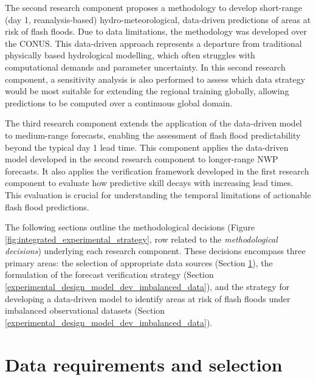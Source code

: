 The  second research component proposes a methodology to develop short-range (day 1, reanalysis-based) hydro-meteorological, data-driven predictions of areas at risk of flash floods. Due to data limitations, the methodology was developed over the CONUS. This data-driven approach represents a departure from traditional physically based hydrological modelling, which often struggles with computational demands and parameter uncertainty. In this second research component, a sensitivity analysis is also performed to assess which data strategy would be most suitable for extending the regional training globally, allowing predictions to be computed over a continuous global domain.

The  third research component extends the application of the data-driven model to medium-range forecasts, enabling the assessment of flash flood predictability beyond the typical day 1 lead time. This component applies the data-driven model developed in the second research component to longer-range NWP forecasts. It also applies the verification framework developed in the first research component to evaluate how predictive skill decays with increasing lead times. This evaluation is crucial for understanding the temporal limitations of actionable flash flood predictions.

The following sections outline the methodological decisions (Figure \ref{fig:integrated_experimental_strategy}, row related to the \textit{methodological decisions}) underlying each research component. These decisions encompass three primary areas: the selection of appropriate data sources (Section \ref{experimental_data_requirements}), the formulation of the forecast verification strategy (Section \ref{experimental_design_model_dev_imbalanced_data}), and the strategy for developing a data-driven model to identify areas at risk of flash floods under imbalanced observational datasets (Section \ref{experimental_design_model_dev_imbalanced_data}). 


\section{Data requirements and selection}
\label{experimental_data_requirements}

